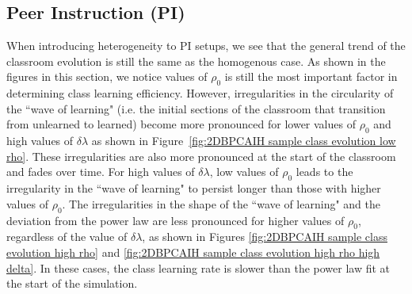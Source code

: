 \subsection{Peer Instruction (PI)}\label{sec:BPCAIH effects on classroom evolution PI}
When introducing heterogeneity to PI setups, we see that the general trend of the classroom evolution is still the same as the homogenous case.
As shown in the figures in this section, we notice values of $\rho_0$ is still the most important factor in determining class learning efficiency. 
However, irregularities in the circularity of the ``wave of learning" (i.e. the initial sections of the classroom that transition from unlearned to learned) become more pronounced for lower values of $\rho_0$ and high values of $\delta\lambda$ as shown in Figure~\ref{fig:2DBPCAIH sample class evolution low rho}.
These irregularities are also more pronounced at the start of the classroom and fades over time.
For high values of $\delta\lambda$, low values of $\rho_0$ leads to the irregularity in the ``wave of learning" to persist longer than those with higher values of $\rho_0$.
The irregularities in the shape of the ``wave of learning" and the deviation from the power law are less pronounced for higher values of $\rho_0$, regardless of the value of $\delta\lambda$, as shown in Figures \ref{fig:2DBPCAIH sample class evolution high rho} and \ref{fig:2DBPCAIH sample class evolution high rho high delta}.
In these cases, the class learning rate is slower than the power law fit at the start of the simulation.

